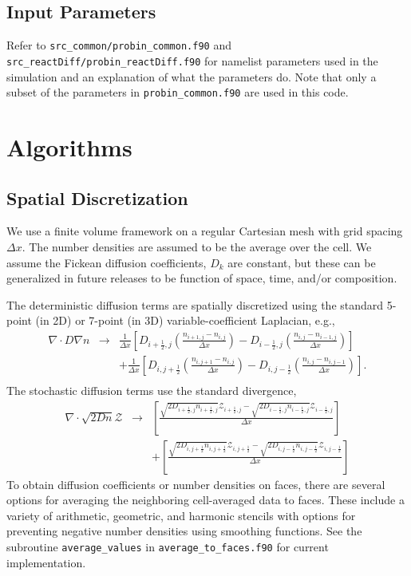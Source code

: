 \documentclass[final]{siamltex}
\def\mZb {\bm{\mathcal{Z}}}
\def\half   {\frac{1}{2}}
\begin{document}
\subsection{Input Parameters}
Refer to {\tt src\_common/probin\_common.f90} and 
{\tt src\_reactDiff/probin\_reactDiff.f90} for namelist parameters used in the
simulation and an explanation of what the parameters do.  Note that only a subset
of the parameters in {\tt probin\_common.f90} are used in this code.

\section{Algorithms}
\subsection{Spatial Discretization}
We use a finite volume framework on a regular Cartesian mesh with grid spacing $\Delta x$.
The number densities are assumed to be the average over the cell.
We assume the Fickean diffusion coefficients, $D_k$ are constant, but these can be generalized
in future releases to be function of space, time, and/or composition.

The deterministic diffusion terms are spatially discretized using the standard 5-point (in 2D) or
7-point (in 3D) variable-coefficient Laplacian, e.g.,
\begin{eqnarray}
\nabla\cdot D\nabla n &\rightarrow& \frac{1}{\Delta x}\left[D_{i+\half,j}\left(\frac{n_{i+1,j}-n_{i,j}}{\Delta x}\right) - D_{i-\half,j}\left(\frac{n_{i,j}-n_{i-1,j}}{\Delta x}\right)\right] \nonumber\\
&& + \frac{1}{\Delta x}\left[D_{i,j+\half}\left(\frac{n_{i,j+1}-n_{i,j}}{\Delta x}\right) - D_{i,j-\half}\left(\frac{n_{i,j}-n_{i,j-1}}{\Delta x}\right)\right]. \nonumber\\
\end{eqnarray}
The stochastic diffusion terms use the standard divergence,
\begin{eqnarray}
\nabla\cdot\sqrt{2Dn}\mZb &\rightarrow&\left[\frac{\sqrt{2D_{i+\half,j}n_{i+\half,j}}\mathcal{Z}_{i+\half,j} - \sqrt{2D_{i-\half,j}n_{i-\half,j}}\mathcal{Z}_{i-\half,j}}{\Delta x}\right]\nonumber\\
&&+ \left[\frac{\sqrt{2D_{i,j+\half}n_{i,j+\half}}\mathcal{Z}_{i,j+\half} - \sqrt{2D_{i,j-\half}n_{i,j-\half}}\mathcal{Z}_{i,j-\half}}{\Delta x}\right]
\end{eqnarray}
To obtain diffusion coefficients or number densities on faces, there are several options for averaging the neighboring cell-averaged data to faces.  These include a variety of arithmetic, geometric, and harmonic stencils with options for preventing negative number densities using smoothing functions.  See the subroutine {\tt average\_values} in {\tt average\_to\_faces.f90} for current implementation.
\end{document}
